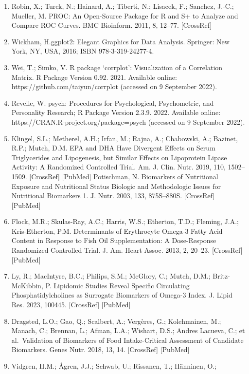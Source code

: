 \documentclass[journal=jacsat,manuscript=article]{achemso}
\begin{document}
\begin{enumerate}
\item
  Robin, X.; Turck, N.; Hainard, A.; Tiberti, N.; Lisacek, F.; Sanchez,
  J.-C.; Mueller, M. PROC: An Open-Source Package for R and S+ to
  Analyze and Compare ROC Curves. BMC Bioinform. 2011, 8, 12--77.
  {[}CrossRef{]}
\item
  Wickham, H.ggplot2: Elegant Graphics for Data Analysis. Springer: New
  York, NY, USA, 2016; ISBN 978-3-319-24277-4.
\item
  Wei, T.; Simko, V. R package `corrplot': Visualization of a
  Correlation Matrix. R Package Version 0.92. 2021. Available online:
  https://github.com/taiyun/corrplot (accessed on 9 September 2022).
\item
  Revelle, W. psych: Procedures for Psychological, Psychometric, and
  Personality Research; R Package Version 2.3.9. 2022. Available online:
  https://CRAN.R-project.org/package=psych (accessed on 9 September
  2022).
\item
  Klingel, S.L.; Metherel, A.H.; Irfan, M.; Rajna, A.; Chabowski, A.;
  Bazinet, R.P.; Mutch, D.M. EPA and DHA Have Divergent Effects on Serum
  Triglycerides and Lipogenesis, but Similar Effects on Lipoprotein
  Lipase Activity: A Randomized Controlled Trial. Am. J. Clin. Nutr.
  2019, 110, 1502--1509. {[}CrossRef{]} {[}PubMed{]} Potischman, N.
  Biomarkers of Nutritional Exposure and Nutritional Status Biologic and
  Methodologic Issues for Nutritional Biomarkers 1. J. Nutr. 2003, 133,
  875S--880S. {[}CrossRef{]} {[}PubMed{]}
\item
  Flock, M.R.; Skulas-Ray, A.C.; Harris, W.S.; Etherton, T.D.; Fleming,
  J.A.; Kris-Etherton, P.M. Determinants of Erythrocyte Omega-3 Fatty
  Acid Content in Response to Fish Oil Supplementation: A Dose-Response
  Randomized Controlled Trial. J. Am. Heart Assoc. 2013, 2, 20--23.
  {[}CrossRef{]} {[}PubMed{]}
\item
  Ly, R.; MacIntyre, B.C.; Philips, S.M.; McGlory, C.; Mutch, D.M.;
  Britz-McKibbin, P. Lipidomic Studies Reveal Specific Circulating
  Phosphatidylcholines as Surrogate Biomarkers of Omega-3 Index. J.
  Lipid Res. 2023, 100445. {[}CrossRef{]} {[}PubMed{]}
\item
  Dragsted, L.O.; Gao, Q.; Scalbert, A.; Vergères, G.; Kolehmainen, M.;
  Manach, C.; Brennan, L.; Afman, L.A.; Wishart, D.S.; Andres Lacueva,
  C.; et al.~Validation of Biomarkers of Food Intake-Critical Assessment
  of Candidate Biomarkers. Genes Nutr. 2018, 13, 14. {[}CrossRef{]}
  {[}PubMed{]}
\item
  Vidgren, H.M.; Ågren, J.J.; Schwab, U.; Rissanen, T.; Hänninen, O.;

\end{enumerate}
\end{document}
